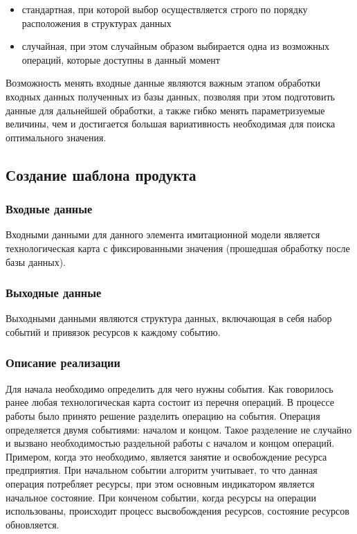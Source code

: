 \begin{itemize}
    \item стандартная, при которой выбор осуществляется строго по порядку расположения в структурах данных
    \item случайная, при этом случайным образом выбирается одна из возможных операций, которые доступны в данный момент 
\end{itemize}

Возможность менять входные данные являются важным этапом обработки входных данных полученных из базы данных, позволяя при этом подготовить данные для дальнейшей обработки, а также гибко менять параметризуемые величины, чем и достигается большая вариативность необходимая для поиска оптимального значения. 

\subsection{Создание шаблона продукта}

\subsubsection{Входные данные}
Входными данными для данного элемента имитационной модели является технологическая карта с фиксированными значения (прошедшая обработку после базы данных).

\subsubsection{Выходные данные}
\label{imcore:mkProductTemplate_output_data}
Выходными данными являются структура данных, включающая в себя набор событий и привязок ресурсов к каждому событию.

\subsubsection{Описание реализации}
Для начала необходимо определить для чего нужны события. Как говорилось ранее любая технологическая карта состоит из перечня операций. В процессе работы было принято решение разделить операцию на события. Операция определяется двумя событиями: началом и концом. Такое разделение не случайно и вызвано необходимостью раздельной работы с началом и концом операций. Примером, когда это необходимо, является занятие и освобождение ресурса предприятия. При начальном событии алгоритм учитывает, то что данная операция потребляет ресурсы, при этом основным индикатором является начальное состояние. При конченом событии, когда ресурсы на операции использованы, происходит процесс высвобождения ресурсов, состояние ресурсов обновляется.


